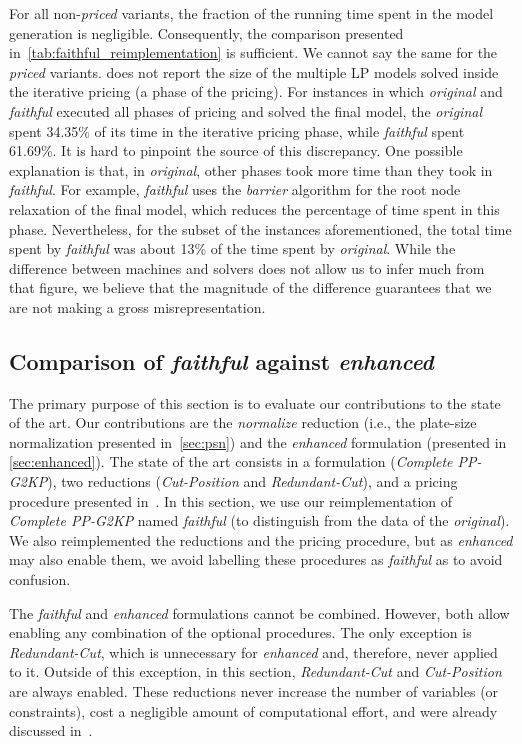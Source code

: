 \documentclass[smallextended]{svjour3}       %
\begin{document}
For all non-\emph{priced} variants, the fraction of the running time spent in the model generation is negligible.
Consequently, the comparison presented in~\autoref{tab:faithful_reimplementation} is sufficient.
We cannot say the same for the \emph{priced} variants.
\cite{furini:2016,dimitri_thesis} does not report the size of the multiple LP models solved inside the iterative pricing (a phase of the pricing).
For instances in which \emph{original} and \emph{faithful} executed all phases of pricing and solved the final model, the \emph{original} spent 34.35\% of its time in the iterative pricing phase, while \emph{faithful} spent 61.69\%.
It is hard to pinpoint the source of this discrepancy.
One possible explanation is that, in \emph{original}, other phases took more time than they took in \emph{faithful}.
For example, \emph{faithful} uses the \emph{barrier} algorithm for the root node relaxation of the final model, which reduces the percentage of time spent in this phase.
Nevertheless, for the subset of the instances aforementioned, the total time spent by \emph{faithful} was about 13\% of the time spent by \emph{original}.
While the difference between machines and solvers does not allow us to infer much from that figure, we believe that the magnitude of the difference guarantees that we are not making a gross misrepresentation.

\subsection{Comparison of \emph{faithful} against \emph{enhanced}}
\label{sec:comparison}

The primary purpose of this section is to evaluate our contributions to the state of the art.
Our contributions are the \emph{normalize} reduction (i.e., the plate-size normalization presented in~\autoref{sec:psn}) and the \emph{enhanced} formulation (presented in \autoref{sec:enhanced}).
The state of the art consists in a formulation (\emph{Complete PP-G2KP}), two reductions (\emph{Cut-Position} and \emph{Redundant-Cut}), and a pricing procedure presented in~\cite{furini:2016,dimitri_thesis}.
In this section, we use our reimplementation of \emph{Complete PP-G2KP} named \emph{faithful} (to distinguish from the data of the \emph{original}).
We also reimplemented the reductions and the pricing procedure, but as \emph{enhanced} may also enable them, we avoid labelling these procedures as \emph{faithful} as to avoid confusion.

The \emph{faithful} and \emph{enhanced} formulations cannot be combined.
However, both allow enabling any combination of the optional procedures.
The only exception is \emph{Redundant-Cut}, which is unnecessary for \emph{enhanced} and, therefore, never applied to it.
Outside of this exception, in this section, \emph{Redundant-Cut} and \emph{Cut-Position} are always enabled.
These reductions never increase the number of variables (or constraints), cost a negligible amount of computational effort, and were already discussed in~\cite{furini:2016,dimitri_thesis}.
\end{document}
